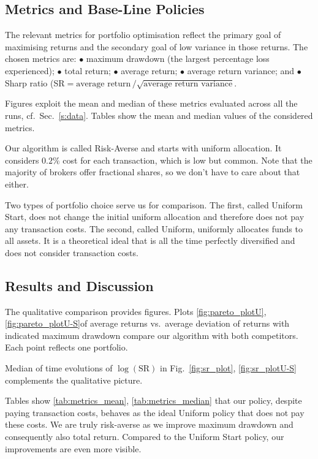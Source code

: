 \subsection{Metrics and Base-Line Policies} \label{s:metrics}
The relevant metrics for portfolio optimisation reflect the primary goal of maximising returns and the secondary goal of low variance in those returns. The chosen metrics are: $\bullet$ maximum drawdown (the largest percentage loss experienced); $\bullet$ total return;
$\bullet$ average return;  $\bullet$ average return variance; and $\bullet$ Sharp ratio (SR$=
\mbox{average return}\,/\sqrt{\mbox{average return variance}}$.

Figures exploit the mean and median of these metrics evaluated across all the runs, cf.\ Sec.\ \ref{s:data}. Tables show the mean and median values of the considered metrics.

Our algorithm is called Risk-Averse and starts with uniform allocation. It considers $0.2\%$ cost for each transaction, which is low but common. Note that the majority of brokers offer fractional shares, so we don't have to care about that either.

Two types of portfolio choice serve us for comparison. The first, called Uniform Start, does not change the initial uniform allocation and therefore does not pay any transaction costs. The second, called Uniform, uniformly allocates funds to all assets. It is a theoretical ideal that is all the time perfectly diversified and does not consider transaction costs.

\subsection{Results and Discussion} \label{s:results}
The qualitative comparison provides figures. Plots \ref{fig:pareto_plotU}, \ref{fig:pareto_plotU-S}of average returns vs.\ average deviation of returns with indicated maximum drawdown compare our algorithm with both competitors. Each point reflects one portfolio.

Median of time evolutions of $\log(\mbox{SR})$ in Fig.\
 \ref{fig:sr_plot}, \ref{fig:sr_plotU-S} complements the qualitative picture.

 Tables show \ref{tab:metrics_mean}, \ref{tab:metrics_median} that our policy, despite paying transaction costs, behaves as the ideal Uniform policy that does not pay these costs. We are truly risk-averse as we improve maximum drawdown and consequently also total return. Compared to the Uniform Start policy, our improvements are even more visible.

